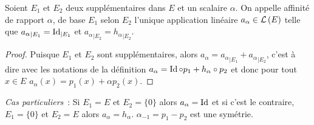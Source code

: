 %
\begin{defdef}\label{def:affinites}
  Soient \(E_1\) et \(E_2\) deux supplémentaires dans \(E\) et un scalaire \(\alpha\). On appelle affinité de rapport \(\alpha\), de base \(E_1\) selon \(E_2\) l'unique application linéaire \(a_\alpha \in \mathcal{L}\left(E\right)\) telle que \({a_\alpha}_{|E_1} = \operatorname{Id}_{|E_1}\) et \({a_\alpha}_{|E_2} = {h_\alpha}_{|E_2}\).
\end{defdef}
%
\begin{proof}
  Puisque \(E_1\) et \(E_2\) sont supplémentaires, alors \(a_\alpha= {a_\alpha}_{|E_1} + {a_\alpha}_{|E_2}\), c'est à dire avec les notations de la définition \(a_\alpha= \operatorname{Id} \circ p_1 + h_\alpha \circ p_2\) et donc pour tout \(x \in E\) \(a_\alpha(x)=p_1(x)+\alpha p_2(x)\).
\end{proof}

\emph{Cas particuliers}~: Si \(E_1=E\) et \(E_2=\{0\}\) alors \(a_\alpha=\operatorname{Id}\) et si c'est le contraire, \(E_1=\{0\}\) et \(E_2=E\) alors \(a_\alpha=h_\alpha\). \(\alpha_{-1}=p_1-p_2\) est une symétrie.

